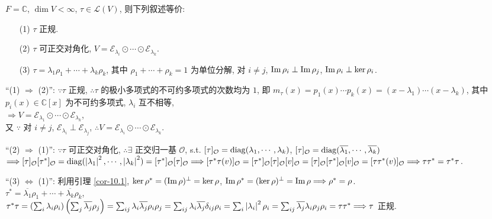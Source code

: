 \documentclass{note}
\begin{document}
\begin{thm}
    $F=\mathbb{C}$, $\dim V<\infty$, $\tau\in\mathcal{L}(V)$, 则下列叙述等价:
    \begin{itemize}
        \item[(1)] $\tau$ 正规.
        \item[(2)] $\tau$ 可正交对角化, $V=\mathcal{E}_{\lambda_i}\odot\cdots\odot\mathcal{E}_{\lambda_k}$.
        \item[(3)] $\tau=\lambda_1\rho_1+\cdots+\lambda_k\rho_k$, 其中 $\rho_1+\cdots+\rho_k=1$ 为单位分解, 对 $i\neq j$, $\operatorname{Im}\rho_i\perp\operatorname{Im}\rho_j$, $\operatorname{Im}\rho_i\perp\ker\rho_i$.
    \end{itemize}
\end{thm}
\begin{pf}
    ``(1) $\Longrightarrow$ (2)'': $\because\tau$ 正规, $\therefore\tau$ 的极小多项式的不可约多项式的次数均为 $1$, 即 $m_{\tau}(x)=p_1(x)\cdots p_k(x)=(x-\lambda_1)\cdots(x-\lambda_k)$, 其中 $p_i(x)\in\mathbb{C}[x]$ 为不可约多项式, $\lambda_i$ 互不相等,\\
    $\Longrightarrow V=\mathcal{E}_{\lambda_1}\odot\cdots\odot\mathcal{E}_{\lambda_k}$,\\
    又 $\because$ 对 $i\neq j$, $\mathcal{E}_{\lambda_i}\perp\mathcal{E}_{\lambda_j}$, $\therefore V=\mathcal{E}_{\lambda_i}\odot\cdots\odot\mathcal{E}_{\lambda_k}$.

    ``(2) $\Longrightarrow$ (1)'': $\because\tau$ 可正交对角化, $\therefore\exists$ 正交归一基 $\mathcal{O}$, s.t. $[\tau]_{\mathcal{O}}=\operatorname{diag}(\lambda_1,\cdots,\lambda_k)$, $[\tau]_{\mathcal{O}}=\operatorname{diag}(\overline{\lambda_1},\cdots,\overline{\lambda_k})$\\
    $\Longrightarrow[\tau]_{\mathcal{O}}[\tau^*]_{\mathcal{O}}=\operatorname{diag}(\left\lvert\lambda_1\right\rvert^2,\cdots,\left\lvert\lambda_k\right\rvert^2)=[\tau^*]_{\mathcal{O}}[\tau]_{\mathcal{O}}\Longrightarrow[\tau^*\tau(v)]_{\mathcal{O}}=[\tau^*]_{\mathcal{O}}[\tau]_{\mathcal{O}}[v]_{\mathcal{O}}=[\tau]_{\mathcal{O}}[\tau^*]_{\mathcal{O}}[v]_{\mathcal{O}}=[\tau\tau^*(v)]_{\mathcal{O}}\Longrightarrow\tau\tau^*=\tau^*\tau$.

    ``(3) $\Longleftrightarrow$ (1)'': 利用引理 \ref{cor-10.1}, $\ker\rho^*=(\operatorname{Im}\rho)^{\perp}=\ker\rho$, $\operatorname{Im}\rho^*=(\ker\rho)^{\perp}=\operatorname{Im}\rho\Longrightarrow\rho^*=\rho$.\\
    $\tau^*=\overline{\lambda_1}\rho_1+\cdots+\overline{\lambda_k}\rho_k$,\\
    $\tau^*\tau=\left(\sum_i\lambda_i\rho_i\right)\left(\sum_j\overline{\lambda_j}\rho_j\right)=\sum_{ij}\lambda_i\overline{\lambda_j}\rho_i\rho_j=\sum_{ij}\lambda_i\overline{\lambda_j}\delta_{ij}\rho_i=\sum_i\left\lvert\lambda_i\right\rvert^2\rho_i=\sum_{ij}\overline{\lambda_j}\lambda_i\rho_j\rho_i=\tau\tau^*\Longrightarrow\tau$ 正规.
\end{pf}
\end{document}
